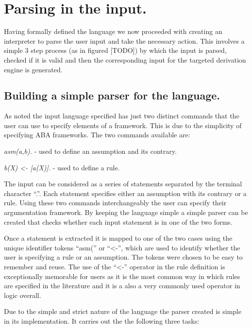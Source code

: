 \section{Parsing in the input.}

Having formally defined the language we now proceeded with creating an interpreter to parse the user input and take the necessary action. This involves a simple 3 step process (as in figured [TODO]) by which the input is parsed, checked if it is valid and then the corresponding input for the targeted derivation engine is generated.

\subsection{Building a simple parser for the language.}

As noted the input language specified has just two distinct commands that the user can use to specify elements of a framework. This is due to the simplicity of specifying ABA frameworks. The two commands available are:

\begin{itemize*}
\item \emph{asm(a,b).} - used to define an assumption and its contrary.
\item \emph{b(X) \textless- [a(X)].} -  used to define a rule.
\end{itemize*}

The input can be considered as a series of statements separated by the terminal character ``.''. Each statement specifies either an assumption with its contrary or a rule. Using these two commands interchangeably  the user can specify their argumentation framework. By keeping the language simple a simple parser can be created that checks whether each input statement is in one of the two forms.

Once a statement is extracted it is mapped to one of the two cases using the unique identifier tokens ``asm('' or ``\textless -'', which are used to identify whether the user is specifying a rule or an assumption. The tokens were chosen to be easy to remember and reuse. The use of the ``\textless -'' operator in the rule definition is exceptionally memorable for users as it is the most common way in which rules are specified in the literature and it is a also a very commonly used operator in logic overall.

Due to the simple and strict nature of the language the parser created is simple in its implementation. It carries out the the following three tasks:

